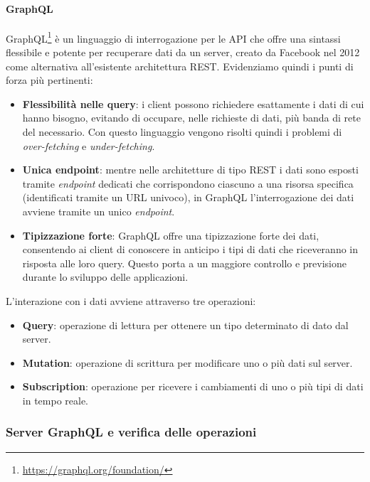 \paragraph{GraphQL}
  GraphQL\footnote{\url{https://graphql.org/foundation/}} è un linguaggio di interrogazione per le \ac{API} che offre una sintassi flessibile e potente per recuperare dati da un server, creato da Facebook nel 2012 come alternativa all'esistente architettura \ac{REST}. Evidenziamo quindi i punti di forza più pertinenti:
\begin{itemize}
	\item \textbf{Flessibilità nelle query}: i client possono richiedere esattamente i dati di cui hanno bisogno, evitando di occupare, nelle richieste di dati, più banda di rete del necessario. Con questo linguaggio vengono risolti quindi i problemi di \textit{over-fetching} e \textit{under-fetching}.
	\item \textbf{Unica endpoint}:  mentre nelle architetture di tipo \ac{REST} i dati sono esposti tramite \textit{endpoint} dedicati che corrispondono ciascuno a una risorsa specifica (identificati tramite un \ac{URL} univoco), in GraphQL l'interrogazione dei dati avviene tramite un unico \textit{endpoint}.
	\item \textbf{Tipizzazione forte}: GraphQL offre una tipizzazione forte dei dati, consentendo ai client di conoscere in anticipo i tipi di dati che riceveranno in risposta alle loro query. Questo porta a un maggiore controllo e previsione durante lo sviluppo delle applicazioni.
\end{itemize}
L'interazione con i dati avviene attraverso tre operazioni: 
\begin{itemize}
	\item \textbf{Query}: operazione di lettura per ottenere un tipo determinato di dato dal server.
	\item \textbf{Mutation}:  operazione di scrittura per modificare uno o più dati sul server.
	\item \textbf{Subscription}: operazione per ricevere i cambiamenti di uno o più tipi di dati in tempo reale.
\end{itemize}

\subsubsection{Server GraphQL e verifica delle operazioni}\label{subsection:graphql-server}


